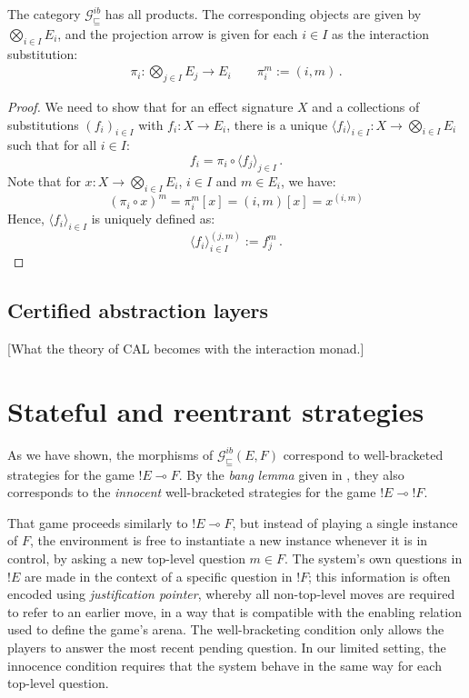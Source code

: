 \documentclass[sigplan,10pt,review,anonymous]{acmart}
\newcommand{\gcat}{\mathcal{G}_{\sqsubseteq}}
\begin{document}
\begin{lemma}
The category $\gcat^{ib}$ has all products.
The corresponding objects are given by $\bigotimes_{i \in I} E_i$,
and the projection arrow
is given for each $i \in I$ as
the interaction substitution:
\begin{gather*}
    \pi_i : \bigotimes_{j \in I} E_j \rightarrow E_i \qquad
    \pi_i^m := (i, m) \,.
\end{gather*}
\begin{proof}
We need to show that for an effect signature $X$
and a collections of substitutions $(f_i)_{i \in I}$ with
$f_i : X \rightarrow E_i$,
there is a unique
$\langle f_i \rangle_{i \in I} : X \rightarrow \bigotimes_{i \in I} E_i$
such that for all $i \in I$:
\[
    f_i = \pi_i \circ \langle f_j \rangle_{j \in I} \,.
\]
Note that for $x : X \rightarrow \bigotimes_{i \in I} E_i$,
$i \in I$ and $m \in E_i$, we have:
\[
    (\pi_i \circ x)^m = \pi_i^m[x] = (i, m) [x] = x^{(i, m)}
\]
Hence, $\langle f_i \rangle_{i \in I}$ is uniquely defined as:
\[
    \langle f_i \rangle_{i \in I}^{(j, m)} := f_j^m \,.
\]
\end{proof}
\end{lemma}


\subsection{Certified abstraction layers}

[What the theory of CAL becomes with the interaction monad.]


\section{Stateful and reentrant strategies} \label{sec:gamesem} %


As we have shown,
the morphisms of $\gcat^{ib}(E, F)$
correspond to well-bracketed strategies
for the game ${!E} \multimap F$.
By the \emph{bang lemma} given in \cite{gamesem99},
they also corresponds to the
\emph{innocent} well-bracketed strategies
for the game ${!E} \multimap {!F}$.

That game proceeds similarly to ${!E} \multimap F$,
but instead of playing a single instance of $F$,
the environment is free to instantiate a new instance
whenever it is in control,
by asking a new top-level question $m \in F$.
The system's own questions in ${!E}$
are made in the context of a specific question in ${!F}$;
this information is often encoded using \emph{justification pointer},
whereby all non-top-level moves are required to refer to
an earlier move,
in a way that is compatible with the enabling relation
used to define the game's arena.
The well-bracketing condition only allows the players
to answer the most recent pending question.
In our limited setting,
the innocence condition requires that the system
behave in the same way for each top-level question.
\end{document}
